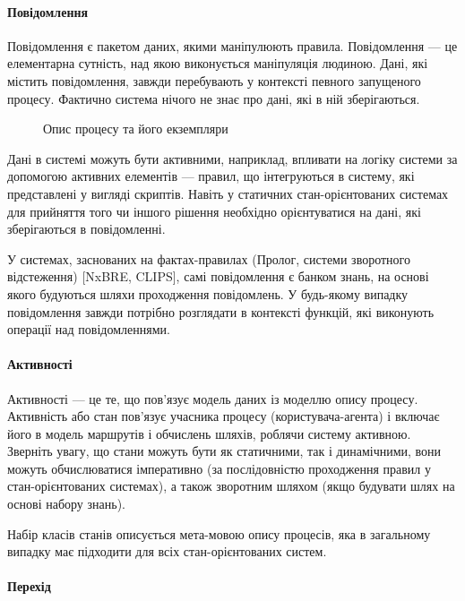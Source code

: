 \documentclass{memoir}
\begin{document}
\paragraph{Повідомлення}

Повідомлення є пакетом даних, якими маніпулюють правила. Повідомлення — це елементарна сутність, над якою виконується маніпуляція людиною. Дані, які містить повідомлення, завжди перебувають у контексті певного запущеного процесу. Фактично система нічого не знає про дані, які в ній зберігаються.

\begin{figure}[h]
    \centering
    \caption{Опис процесу та його екземпляри}
    \label{fig:process_instances}
\end{figure}

Дані в системі можуть бути активними, наприклад, впливати на логіку системи за допомогою активних елементів — правил, що інтегруються в систему, які представлені у вигляді скриптів. Навіть у статичних стан-орієнтованих системах для прийняття того чи іншого рішення необхідно орієнтуватися на дані, які зберігаються в повідомленні.

У системах, заснованих на фактах-правилах (Пролог, системи зворотного відстеження) [NxBRE, CLIPS], самі повідомлення є банком знань, на основі якого будуються шляхи проходження повідомлень. У будь-якому випадку повідомлення завжди потрібно розглядати в контексті функцій, які виконують операції над повідомленнями.

\paragraph{Активності}

Активності — це те, що пов’язує модель даних із моделлю опису процесу. Активність або стан пов’язує учасника процесу (користувача-агента) і включає його в модель маршрутів і обчислень шляхів, роблячи систему активною. Зверніть увагу, що стани можуть бути як статичними, так і динамічними, вони можуть обчислюватися імперативно (за послідовністю проходження правил у стан-орієнтованих системах), а також зворотним шляхом (якщо будувати шлях на основі набору знань).

Набір класів станів описується мета-мовою опису процесів, яка в загальному випадку має підходити для всіх стан-орієнтованих систем.

\paragraph{Перехід}
\end{document}
